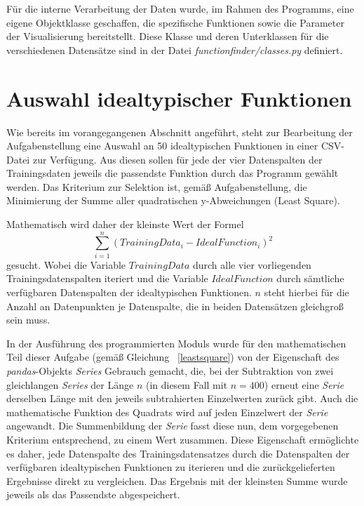 Für die interne Verarbeitung der Daten wurde, im Rahmen des Programms, eine eigene Objektklasse geschaffen, die spezifische Funktionen sowie die Parameter der Visualisierung bereitstellt. Diese Klasse und deren Unterklassen für die verschiedenen Datensätze sind in der Datei \emph{functionfinder/classes.py} definiert.

\section{Auswahl idealtypischer Funktionen}

Wie bereits im vorangegangenen Abschnitt angeführt, steht zur Bearbeitung der Aufgabenstellung eine Auswahl an 50 idealtypischen Funktionen in einer CSV-Datei zur Verfügung. Aus diesen sollen für jede der vier Datenspalten der Trainingsdaten jeweils die passendste Funktion durch das Programm gewählt werden. Das Kriterium zur Selektion ist, gemäß Aufgabenstellung, die Minimierung der Summe aller quadratischen y-Abweichungen (Least Square).

Mathematisch wird daher der kleinste Wert der Formel
\begin{equation}  
\sum_{i=1}^{n}(TrainingData_{i} - IdealFunction_{i})^2
\label{leastsquare}
\end{equation}
gesucht. Wobei die Variable $TrainingData$ durch alle vier vorliegenden Trainingsdatenspalten iteriert und die Variable $IdealFunction$ durch sämtliche verfügbaren Datenspalten der idealtypischen Funktionen. $n$ steht hierbei für die Anzahl an Datenpunkten je Datenspalte, die in beiden Datensätzen gleichgroß sein muss. 

In der Ausführung des programmierten Moduls wurde für den mathematischen Teil dieser Aufgabe (gemäß Gleichung ~\ref{leastsquare})  von der Eigenschaft des \emph{pandas}-Objekts \emph{Series} Gebrauch gemacht, die, bei der Subtraktion von zwei gleichlangen \emph{Series} der Länge $n$ (in diesem Fall mit $n=400$) erneut eine \emph{Serie} derselben Länge mit den jeweils subtrahierten Einzelwerten zurück gibt. Auch die mathematische Funktion des Quadrats wird auf jeden Einzelwert der \emph{Serie} angewandt. Die Summenbildung der \emph{Serie} fasst diese nun, dem vorgegebenen Kriterium entsprechend, zu einem Wert zusammen.
Diese Eigenschaft ermöglichte es daher, jede Datenspalte des Trainingsdatensatzes durch die Datenspalten der verfügbaren idealtypischen Funktionen zu iterieren und die zurückgelieferten Ergebnisse direkt zu vergleichen. Das Ergebnis mit der kleinsten Summe wurde jeweils als das Passendste abgespeichert.

